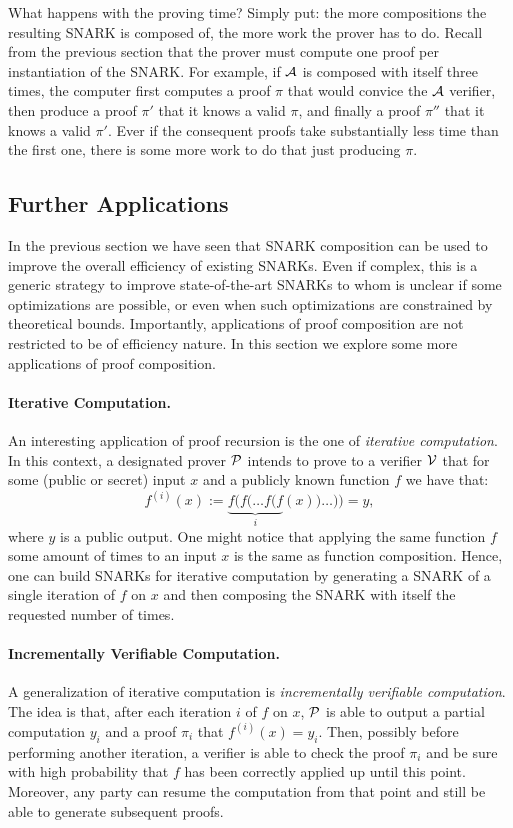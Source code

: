 What happens with the proving time? Simply put: the more compositions the resulting SNARK is composed of, the more work the prover has to do. Recall from the previous section that the prover must compute one proof per instantiation of the SNARK. For example, if $\A$ is composed with itself three times, the computer first computes a proof $\pi$ that would convice the $\A$ verifier, then produce a proof $\pi'$ that it knows a valid $\pi$, and finally a proof $\pi''$ that it knows a valid $\pi'$. Ever if the consequent proofs take substantially less time than the first one, there is some more work to do that just producing $\pi$.





\subsection{Further Applications}

In the previous section we have seen that SNARK composition can be used to improve the overall efficiency of existing SNARKs. Even if complex, this is a generic strategy to improve state-of-the-art SNARKs to whom is unclear if some optimizations are possible, or even when such optimizations are constrained by theoretical bounds. Importantly, applications of proof composition are not restricted to be of efficiency nature. In this section we explore some more applications of proof composition.



\paragraph*{Iterative Computation.} An interesting application of proof recursion is the one of \textit{iterative computation}. In this context, a designated prover $\P$ intends to prove to a verifier $\V$ that for some (public or secret) input $x$ and a publicly known function $f$ we have that:
\[
	f^{(i)}(x) := \underbrace{f(f(\dots f(f}_{i}(x)) \dots)) = y,
\]
where $y$ is a public output. One might notice that applying the same function $f$ some amount of times to an input $x$ is the same as function composition. Hence, one can build SNARKs for iterative computation by generating a SNARK of a single iteration of $f$ on $x$ and then composing the SNARK with itself the requested number of times.

\paragraph*{Incrementally Verifiable Computation.} A generalization of iterative computation is \textit{incrementally verifiable computation}. The idea is that, after each iteration $i$ of $f$ on $x$, $\P$ is able to output a partial computation $y_i$ and a proof $\pi_i$ that $f^{(i)}(x) = y_i$. Then, possibly before performing another iteration, a verifier is able to check the proof $\pi_i$ and be sure with high probability that $f$ has been correctly applied up until this point. Moreover, any party can resume the computation from that point and still be able to generate subsequent proofs.

